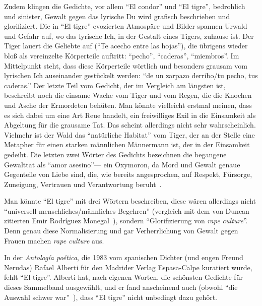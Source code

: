 Zudem klingen die Gedichte, vor allem ``El condor'' und ``El tigre'', bedrohlich und sinister, Gewalt gegen das lyrische Du wird grafisch beschrieben und glorifiziert.
Die in ``El tigre'' evozierten Atmospäre und Bilder spannen Urwald und Gefahr auf, wo das lyrische Ich, in der Gestalt eines Tigers, zuhause ist.
Der Tiger lauert die Geliebte auf (``Te acecho entre las hojas''), die übrigens wieder bloß als vereinzelte Körperteile auftritt: ``pecho'', ``caderas'', ``miembros''.
Im Mittelpunkt steht, dass diese Körperteile wörtlich und besonders grausam vom lyrischen Ich auseinander gestückelt werden:
``de un zarpazo derribo/tu pecho, tus caderas.''
Der letzte Teil vom Gedicht, der im Vergleich am längsten ist, beschreibt noch die einsame Wache vom Tiger und vom Regen, die die Knochen und Asche der Ermordeten behüten.
Man könnte vielleicht erstmal meinen, dass es sich dabei um eine Art Reue handelt, ein freiwilliges Exil in die Einsamkeit als Abgeltung für die grausame Tat.
Das scheint allerdings nicht sehr wahrscheinlich.
Vielmehr ist der Wald das ``natürliche Habitat'' vom Tiger, der an der Stelle eine Metapher für einen starken männlichen Männermann ist, der in der Einsamkeit gedeiht.
Die letzten zwei Wörter des Gedichts bezeichnen die begangene Gewalttat als ``amor asesino''—
ein Oxymoron, da Mord und Gewalt genaue Gegenteile von Liebe sind, die, wie bereits angesprochen, auf Respekt, Fürsorge, Zuneigung, Vertrauen und Verantwortung beruht~\cite{hooks2001}.

Man könnte ``El tigre'' mit drei Wörtern beschreiben, diese wären allerdings nicht ``universell menschliches/männliches Begehren'' (vergleich mit dem von Duncan zitierten Emir Rodríguez Monegal~\cite{Duncan1992}), sondern ``Glorifizierung von \textit{rape culture}''.
Denn genau diese Normalisierung und gar Verherrlichung von Gewalt gegen Frauen machen \textit{rape culture} aus.

\begin{comment}
Rape ist nicht Liebe oder Desire; Es geht um Macht;
Und genau durch solche Aussagen, die solche Vorstellungen normalisieren, anstatt sie als Gewalt zu diffamieren, wird diese weiter aufrechterhalten.
\end{comment}

In der \textit{Antología poética}, die 1983 vom spanischen Dichter (und engen Freund Nerudas) Rafael Alberti für den Madrider Verlag Espasa-Calpe kuratiert wurde, fehlt ``El tigre''.
Alberti hat, nach eigenen Worten, die schönsten Gedichte für dieses Sammelband ausgewählt, und er fand anscheinend auch (obwohl ``die Auswahl schwer war''~\cite{Alberti1983}), dass ``El tigre'' nicht unbedingt dazu gehört.


